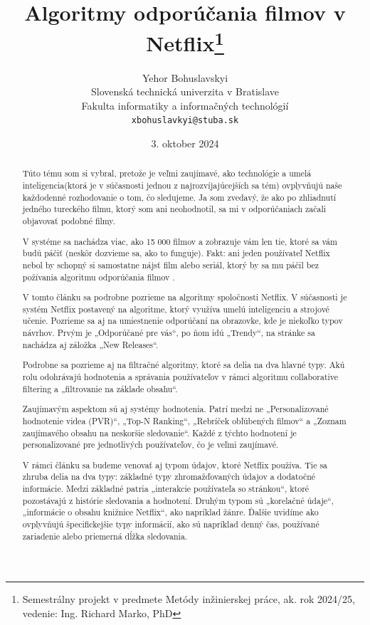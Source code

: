 \documentclass[10pt,twoside,slovak,a4paper]{article}
\title{Algoritmy odporúčania filmov v Netflix\thanks{Semestrálny projekt v predmete Metódy inžinierskej práce, ak. rok 2024/25, vedenie: Ing. Richard Marko, PhD}}
\author{Yehor Bohuslavskyi\\[2pt]
	{\small Slovenská technická univerzita v Bratislave}\\
	{\small Fakulta informatiky a informačných technológií}\\
	{\small \texttt{xbohuslavkyi@stuba.sk}}
	}
\date{\small 3. oktober 2024}
\begin{document}
\maketitle

\begin{abstract}
Túto tému som si vybral, pretože je veľmi zaujímavé, ako technológie a umelá inteligencia(ktorá je v súčasnosti jednou z najrozvíjajúcejších sa tém) ovplyvňujú naše každodenné rozhodovanie o tom, čo sledujeme. Ja som zvedavý, že ako po zhliadnutí jedného tureckého filmu, ktorý som ani neohodnotil, sa mi v odporúčaniach začali objavovať podobné filmy. 

V systéme sa nachádza viac, ako 15 000 filmov a zobrazuje vám len tie, ktoré sa vám budú páčiť (neskôr dozvieme sa, ako to funguje). Fakt: ani jeden používateľ Netflix nebol by schopný si samostatne nájsť film alebo seriál, ktorý by sa mu páčil bez požívania algoritmu odporúčania filmov \cite{netflixRecAlgorithm}.
 
V tomto článku sa podrobne pozrieme na algoritmy spoločnosti Netflix. V súčasnosti je systém Netflix postavený na algoritme, ktorý využíva umelú inteligenciu a strojové učenie. Pozrieme sa aj na umiestnenie odporúčaní na obrazovke, kde je niekoľko typov návrhov. Prvým je „Odporúčané pre vás“, po ňom idú „Trendy“, na stránke sa nachádza aj záložka „New Releases“.

Podrobne sa pozrieme aj na filtračné algoritmy, ktoré sa delia na dva hlavné typy. Akú rolu odohrávajú hodnotenia a správania používateľov v rámci algoritmu collaborative filtering a „filtrovanie na základe obsahu“.

Zaujímavým aspektom sú aj systémy hodnotenia. Patrí medzi ne „Personalizované hodnotenie videa (PVR)“, „Top-N Ranking“, „Rebríček obľúbených filmov“ a „Zoznam zaujímavého obsahu na neskoršie sledovanie“. Každé z týchto hodnotení je personalizované pre jednotlivých používateľov, čo je veľmi zaujímavé.

V rámci článku sa budeme venovať aj typom údajov, ktoré Netflix používa. Tie sa zhruba delia na dva typy: základné typy zhromažďovaných údajov a dodatočné informácie. Medzi základné patria „interakcie používateľa so stránkou“, ktoré pozostávajú z histórie sledovania a hodnotení. Druhým typom sú „korelačné údaje“, „informácie o obsahu knižnice Netflix“, ako napríklad žánre. Ďalšie uvidíme ako ovplyvňujú  špecifickejšie typy informácií, ako sú napríklad denný čas, používané zariadenie alebo priemerná dĺžka sledovania.

\end{abstract}
\end{document}
